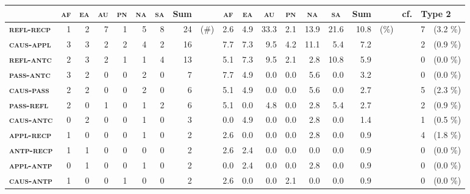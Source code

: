 \begin{sidewaystable}
	\setlength{\tabcolsep}{4.8pt}
	\begin{tabularx}{\textwidth}{lrrrrrrrlrrrrrrrlrrr}
		\lsptoprule
		& \multicolumn{1}{c}{\textbf{\textsc{af}}} & \multicolumn{1}{c}{\textbf{\textsc{ea}}} & \multicolumn{1}{c}{\textbf{\textsc{au}}} & \multicolumn{1}{c}{\textbf{\textsc{pn}}} & \multicolumn{1}{c}{\textbf{\textsc{na}}} & \multicolumn{1}{c}{\textbf{\textsc{sa}}} & \multicolumn{1}{c}{\textbf{Sum}} & & \multicolumn{1}{c}{\textbf{\textsc{af}}} & \multicolumn{1}{c}{\textbf{\textsc{ea}}} & \multicolumn{1}{c}{\textbf{\textsc{au}}} & \multicolumn{1}{c}{\textbf{\textsc{pn}}} & \multicolumn{1}{c}{\textbf{\textsc{na}}} & \multicolumn{1}{c}{\textbf{\textsc{sa}}} & \multicolumn{1}{c}{\textbf{Sum}} & & cf. & \multicolumn{2}{l}{\textbf{Type 2}} \\
		\midrule
		\textbf{\textsc{refl-recp}} & 1 & 2 & 7 & 1 & 5 & 8 & 24 & (\#) & 2.6 & 4.9 & 33.3 & 2.1 & 13.9 & 21.6 & 10.8 & (\%) & & 7 & (3.2 \%) \\
		\textbf{\textsc{caus-appl}} & 3 & 3 & 2 & 2 & 4 & 2 & 16 & & 7.7 & 7.3 & 9.5 & 4.2 & 11.1 & 5.4 & 7.2 & & & 2 & (0.9 \%) \\
		\textbf{\textsc{refl-antc}} & 2 & 3 & 2 & 1 & 1 & 4 & 13 & & 5.1 & 7.3 & 9.5 & 2.1 & 2.8 & 10.8 & 5.9 & & & 0 & (0.0 \%) \\
		\textbf{\textsc{pass-antc}} & 3 & 2 & 0 & 0 & 2 & 0 & 7 & & 7.7 & 4.9 & 0.0 & 0.0 & 5.6 & 0.0 & 3.2 & & & 0 & (0.0 \%) \\
		\textbf{\textsc{caus-pass}} & 2 & 2 & 0 & 0 & 2 & 0 & 6 & & 5.1 & 4.9 & 0.0 & 0.0 & 5.6 & 0.0 & 2.7 & & & 5 & (2.3 \%) \\
		\textbf{\textsc{pass-refl}} & 2 & 0 & 1 & 0 & 1 & 2 & 6 & & 5.1 & 0.0 & 4.8 & 0.0 & 2.8 & 5.4 & 2.7 & & & 2 & (0.9 \%) \\
		\textbf{\textsc{caus-antc}} & 0 & 2 & 0 & 0 & 1 & 0 & 3 & & 0.0 & 4.9 & 0.0 & 0.0 & 2.8 & 0.0 & 1.4 & & & 1 & (0.5 \%) \\
		\textbf{\textsc{appl-recp}} & 1 & 0 & 0 & 0 & 1 & 0 & 2 & & 2.6 & 0.0 & 0.0 & 0.0 & 2.8 & 0.0 & 0.9 & & & 4 & (1.8 \%) \\
		\textbf{\textsc{antp-recp}} & 1 & 1 & 0 & 0 & 0 & 0 & 2 & & 2.6 & 2.4 & 0.0 & 0.0 & 0.0 & 0.0 & 0.9 & & & 0 & (0.0 \%) \\
		\textbf{\textsc{appl-antp}} & 0 & 1 & 0 & 0 & 1 & 0 & 2 & & 0.0 & 2.4 & 0.0 & 0.0 & 2.8 & 0.0 & 0.9 & & & 0 & (0.0 \%) \\
		\textbf{\textsc{caus-antp}} & 1 & 0 & 0 & 1 & 0 & 0 & 2 & & 2.6 & 0.0 & 0.0 & 2.1 & 0.0 & 0.0 & 0.9 & & & 0 & (0.0 \%) \\

\end{tabularx}
\end{sidewaystable}
